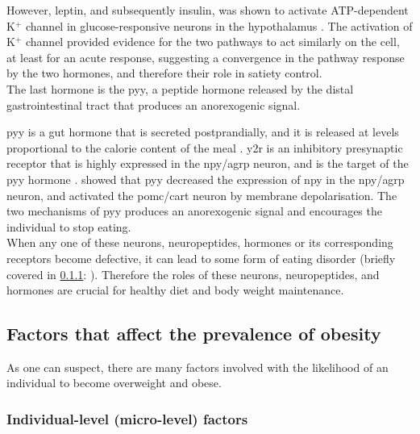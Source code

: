 However, leptin, and subsequently insulin, was shown to activate ATP-dep\-endent K$^+$ channel in glucose-responsive neurons in the hypothalamus \citep{Spanswick1997, Spanswick2000}.
The activation of K$^+$ channel provided evidence for the two pathways to act similarly on the cell, at least for an acute response, suggesting a convergence in the pathway response by the two hormones, and therefore their role in satiety control.
\\

\noindent
The last hormone is the \gls{pyy}, a peptide hormone released by the distal gastrointestinal tract that produces an anorexogenic signal.

\gls{pyy} is a gut hormone that is secreted postprandially, and it is released at levels proportional to the calorie content of the meal \citep{Adrian1985}.
\gls{y2r} is an inhibitory presynaptic receptor that is highly expressed in the \gls{npy}/\gls{agrp} neuron, and is the target of the \gls{pyy} hormone \citep{Batterham2002}.
\citet{Batterham2002} showed that \gls{pyy} decreased the expression of \gls{npy} in the \gls{npy}/\gls{agrp} neuron, and activated the \gls{pomc}/\gls{cart} neuron by membrane depolarisation.
The two mechanisms of \gls{pyy} produces an anorexogenic signal and encourages the individual to stop eating.\\

\noindent
When any one of these neurons, neuropeptides, hormones or its corresponding receptors become defective, it can lead to some form of eating disorder (briefly covered in \cref{ssub:Individual-level_(micro-level)_factors}: ).
Therefore the roles of these neurons, neuropeptides, and hormones are crucial for healthy diet and body weight maintenance.

\subsection{Factors that affect the prevalence of obesity}
\label{sub:factors_that_affect_the_prevalence_of_obesity}

As one can suspect, there are many factors involved with the likelihood of an individual to become overweight and obese.

\subsubsection{Individual-level (micro-level) factors}
\label{ssub:Individual-level_(micro-level)_factors}


